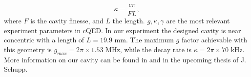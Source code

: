 \begin{equation}
\kappa =\frac{c\pi}{FL},
\end{equation}
where $F$ is the cavity finesse, and $L$ the length. $g,\kappa,\gamma$ are the most relevant experiment parameters in cQED. In our experiment the designed cavity is near concentric with a length of $L = 19.9$ mm. The maximum $g$ factor achievable with this geometry is $g_{max} = 2\pi \times 1.53$ MHz, while the decay rate is $\kappa = 2\pi\times 70$ kHz. More information on our cavity can be found in \cite{Krutyanskiy2019} and in the upcoming thesis of J. Schupp.%
